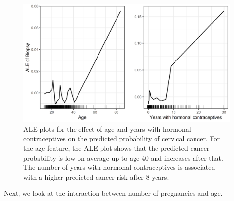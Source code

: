 \documentclass[12pt,]{krantz}
\begin{document}
\begin{figure}

{\centering \includegraphics[width=\textwidth]{images/ale-cervical-1D-1} 

}

\caption{ALE plots for the effect of age and years with hormonal contraceptives on the predicted probability of cervical cancer. For the age feature, the ALE plot shows that the predicted cancer probability is low on average up to age 40 and increases after that. The number of years with hormonal contraceptives is associated with a higher predicted cancer risk after 8 years.}\label{fig:ale-cervical-1D}
\end{figure}

Next, we look at the interaction between number of pregnancies and age.
\end{document}
